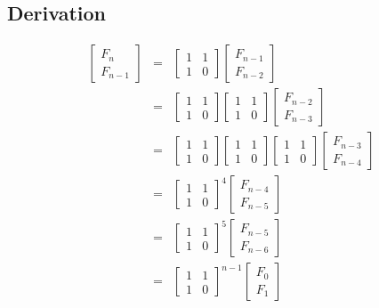 \subsection*{Derivation}
\begin{eqnarray*}
\begin{bmatrix}
	F_n\\
	F_{n-1}
\end{bmatrix}	
&=&
\begin{bmatrix}
	1 & 1\\
	1 & 0
\end{bmatrix}
\begin{bmatrix}
	F_{n-1}\\
	F_{n-2}
\end{bmatrix}\\
&=&
\begin{bmatrix}
	1 & 1\\
	1 & 0
\end{bmatrix}
\begin{bmatrix}
	1 & 1\\
	1 & 0
\end{bmatrix}
\begin{bmatrix}
	F_{n-2}\\
	F_{n-3}
\end{bmatrix}\\
&=&
\begin{bmatrix}
	1 & 1\\
	1 & 0
\end{bmatrix}
\begin{bmatrix}
	1 & 1\\
	1 & 0
\end{bmatrix}
\begin{bmatrix}
	1 & 1\\
	1 & 0
\end{bmatrix}
\begin{bmatrix}
	F_{n-3}\\
	F_{n-4}
\end{bmatrix}\\
&=&
\begin{bmatrix}
	1 & 1\\
	1 & 0
\end{bmatrix}^4
\begin{bmatrix}
	F_{n-4}\\
	F_{n-5}
\end{bmatrix}\\
&=&
\begin{bmatrix}
	1 & 1\\
	1 & 0
\end{bmatrix}^5
\begin{bmatrix}
	F_{n-5}\\
	F_{n-6}
\end{bmatrix}\\
&=&
\begin{bmatrix}
	1 & 1\\
	1 & 0
\end{bmatrix}^{n-1}
\begin{bmatrix}
	F_{0}\\
	F_{1}
\end{bmatrix}\\
\end{eqnarray*}
